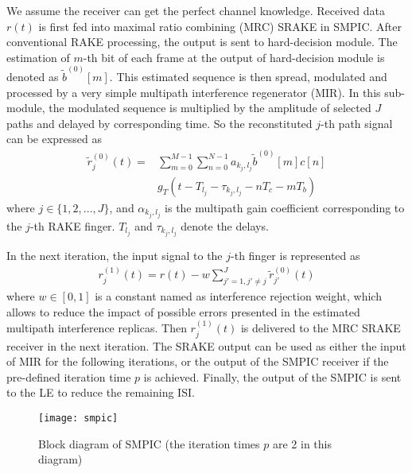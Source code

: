 \documentclass[journal]{IEEEtran}
\begin{document}
We assume the receiver can get the perfect channel knowledge.
Received data $r(t)$ is first fed into maximal ratio combining (MRC)
SRAKE in SMPIC. After conventional RAKE processing, the output is
sent to hard-decision module. The estimation of $m$-th bit of each
frame at the output of hard-decision module is denoted as
$\widetilde{b}^{(0)}[m]$. This estimated sequence is then spread,
modulated and processed by a very simple multipath interference
regenerator (MIR). In this sub-module, the modulated sequence is
multiplied by the amplitude of selected $J$ paths and delayed by
corresponding time. So the reconstituted $j$-th path signal can be
expressed as
\begin{equation}
\label{regen}
\begin{aligned}
\widetilde{r}_j^{(0)}(t)=
&\sum\limits_{m=0}^{M-1}\sum\limits_{n=0}^{N-1}a_{k_j,l_j}\widetilde{b}^{(0)}[m]c[n]\\
&g_T(t-T_{l_j}-\tau_{k_j,l_j}-nT_c-mT_b)
\end{aligned}
\end{equation}
where $j\in\{1,2,...,J\}$, and $\alpha_{k_j,l_j}$ is the multipath
gain coefficient corresponding to the $j$-th RAKE finger. $T_{l_j}$
and $\tau_{k_j,l_j}$ denote the delays.

In the next iteration, the input signal to the $j$-th finger is
represented as
\begin{equation}
\label{iteration}
\begin{aligned} r_j^{(1)}(t)=r(t)-w\sum\limits_{j'=1,j'\neq j}^J
\widetilde{r}_{j'}^{(0)}(t)
\end{aligned}
\end{equation}
where $w\in[0,1]$ is a constant named as interference rejection
weight, which allows to reduce the impact of possible errors
presented in the estimated multipath interference replicas. Then
$r_j^{(1)}(t)$ is delivered to the MRC SRAKE receiver in the next
iteration. The SRAKE output can be used as either the input of MIR
for the following iterations, or the output of the SMPIC receiver if
the pre-defined iteration time $p$ is achieved. Finally, the output
of the SMPIC is sent to the LE to reduce the remaining ISI.

\begin{figure}[t]
\begin{center}
  \texttt{[image: smpic]}
  \caption{Block diagram of SMPIC (the iteration times $p$ are 2 in this diagram)}
  \label{smpic}
\end{center}
\end{figure}
\end{document}
